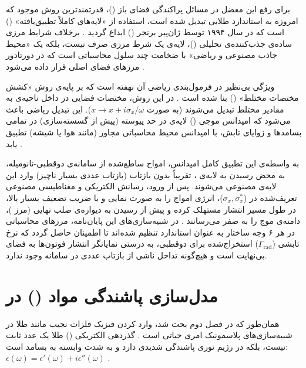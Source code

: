 \documentclass[12pt,a4paper]{report}
\newcommand{\sub}[1]{\mathrm{#1}}               %
\begin{document}
برای رفع این معضل در مسائل پراکندگی فضای باز ()، قدرتمندترین روش موجود که امروزه به استاندارد طلایی  تبدیل شده است، استفاده از «لایه‌های کاملاً تطبیق‌یافته» () است که در سال ۱۹۹۴ توسط ژان‌پیر برنجر () ابداع گردید \cite{berenger}. برخلاف شرایط مرزی ساده‌ی جذب‌کننده‌ی تحلیلی ()، لایه‌ی  یک شرط مرزی صرف نیست، بلکه یک «محیط جاذب مصنوعی و ریاضی» با ضخامت چند سلول محاسباتی است که در دورتادور مرزهای فضای اصلی قرار داده می‌شود \cite{berenger,taflove}.

ویژگی بی‌نظیر  در فرمول‌بندی ریاضی آن نهفته است که بر پایه‌ی روش «کشش مختصات مختلط» () بنا شده است \cite{taflove}. در این روش، مختصات فضایی در داخل ناحیه‌ی  به مقادیر مختلط تبدیل می‌شوند (به صورت $x\to x+i\sigma_x/\omega$). این تبدیل ریاضی باعث می‌شود که امپدانس موجی () لایه‌ی  در حد پیوسته (پیش از گسسته‌سازی) در تمامی بسامدها و زوایای تابش، با امپدانس محیط محاسباتی مجاور (مانند هوا یا شیشه) تطبیق یابد \cite{berenger,taflove}.

به واسطه‌ی این تطبیق کامل امپدانس، امواج ساطع‌شده از سامانه‌ی دوقطبی-نانومیله، به محض رسیدن به لایه‌ی ، تقریباً بدون بازتاب (بازتاب عددی بسیار ناچیز) وارد این لایه‌ی مصنوعی می‌شوند. پس از ورود، رسانش الکتریکی و مغناطیسی مصنوعی تعریف‌شده در  ($\sigma_x,\sigma_x^*$)، انرژی امواج را به صورت نمایی و با ضریب تضعیف بسیار بالا، در طول مسیر انتشار مستهلک کرده و پیش از رسیدن به دیواره‌ی صلب نهایی (مرز )، دامنه‌ی موج را به صفر می‌رسانند \cite{berenger,taflove}. در شبیه‌سازی‌های این پایان‌نامه، مرزهای محاسباتی در هر ۶ وجه ساختار به عنوان  استاندارد تنظیم شده‌اند تا اطمینان حاصل گردد که نرخ تابشی ($\Gamma_{\sub{rad}}$) استخراج‌شده برای دوقطبی، به درستی نمایانگر انتشار فوتون‌ها به فضای بی‌نهایت است و هیچ‌گونه تداخل ناشی از بازتاب عددی در سامانه وجود ندارد.

\section{مدل‌سازی پاشندگی مواد () در }
همان‌طور که در فصل دوم بحث شد، وارد کردن فیزیک فلزات نجیب مانند طلا در شبیه‌سازی‌های پلاسمونیک امری حیاتی است \cite{maier}. گذردهی الکتریکی () طلا یک عدد ثابت نیست، بلکه در رژیم نوری پاشندگی شدیدی دارد و به شدت وابسته به بسامد است: $\epsilon(\omega)=\epsilon'(\omega)+i\epsilon''(\omega)$ \cite{maier,jc}.
\end{document}
